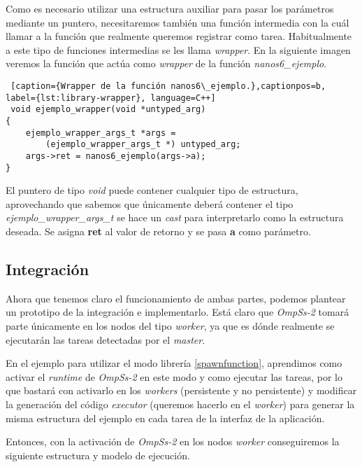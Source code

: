 Como es necesario utilizar una estructura auxiliar para pasar los parámetros mediante un puntero, necesitaremos también una función intermedia con la cuál llamar a la función que realmente queremos registrar como tarea. Habitualmente a este tipo de funciones intermedias se les llama \textit{wrapper}. En la siguiente imagen veremos la función que actúa como \textit{wrapper} de la función \textit{nanos6\_ejemplo}. \smallskip

\begin{lstlisting} [caption={Wrapper de la función nanos6\_ejemplo.},captionpos=b, label={lst:library-wrapper}, language=C++]
 void ejemplo_wrapper(void *untyped_arg)
{
    ejemplo_wrapper_args_t *args = 
        (ejemplo_wrapper_args_t *) untyped_arg;
    args->ret = nanos6_ejemplo(args->a);
}
\end{lstlisting}

El puntero de tipo \textit{void} puede contener cualquier tipo de estructura, aprovechando que sabemos que únicamente deberá contener el tipo \textit{ejemplo\_wrapper\_args\_t} se hace un \textit{cast} para interpretarlo como la estructura deseada. Se asigna \textbf{ret} al valor de retorno y se pasa \textbf{a} como parámetro.


\subsection{Integración}

Ahora que tenemos claro el funcionamiento de ambas partes, podemos plantear un prototipo de la integración e implementarlo. Está claro que \textit{OmpSs-2} tomará parte únicamente en los nodos del tipo \textit{worker}, ya que es dónde realmente se ejecutarán las tareas detectadas por el \textit{master}. 
\par\medskip

En el ejemplo para utilizar el modo librería \ref{spawnfunction}, aprendimos como activar el \textit{runtime} de \textit{OmpSs-2} en este modo y como ejecutar las tareas, por lo que bastará con activarlo en los \textit{workers} (persistente y no persistente) y modificar la generación del código \textit{executor} (queremos hacerlo en el \textit{worker}) para generar la misma estructura del ejemplo en cada tarea de la interfaz de la aplicación.
\par\medskip
Entonces, con la activación de \textit{OmpSs-2} en los nodos \textit{worker} conseguiremos la siguiente estructura y modelo de ejecución.

